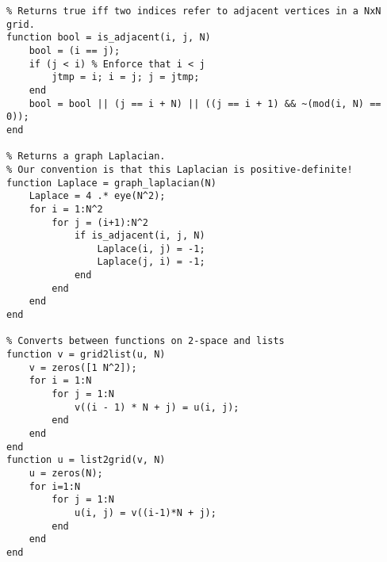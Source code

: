 \documentclass[10pt]{article}
\theoremstyle{definition}
\begin{document}
\begin{verbatim}
% Returns true iff two indices refer to adjacent vertices in a NxN grid.
function bool = is_adjacent(i, j, N)
    bool = (i == j);
    if (j < i) % Enforce that i < j
        jtmp = i; i = j; j = jtmp;
    end
    bool = bool || (j == i + N) || ((j == i + 1) && ~(mod(i, N) == 0));
end

% Returns a graph Laplacian.
% Our convention is that this Laplacian is positive-definite!
function Laplace = graph_laplacian(N)
    Laplace = 4 .* eye(N^2);
    for i = 1:N^2
        for j = (i+1):N^2
            if is_adjacent(i, j, N)
                Laplace(i, j) = -1;
                Laplace(j, i) = -1;
            end
        end
    end
end

% Converts between functions on 2-space and lists
function v = grid2list(u, N)
    v = zeros([1 N^2]);
    for i = 1:N
        for j = 1:N
            v((i - 1) * N + j) = u(i, j);
        end
    end
end
function u = list2grid(v, N)
    u = zeros(N);
    for i=1:N
        for j = 1:N
            u(i, j) = v((i-1)*N + j);
        end
    end
end
\end{verbatim}
\end{document}
